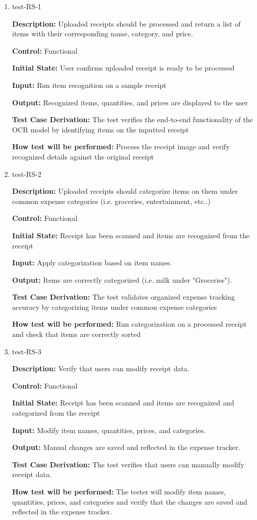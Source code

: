 \documentclass[12pt, titlepage]{article}
\begin{document}
\begin{enumerate}
\item{test-RS-1\\}

\textbf{Description:} Uploaded receipts should be processed and return a list of
items with their corresponding name, category, and price.

\textbf{Control:} Functional

\textbf{Initial State:} User confirms uploaded receipt is ready to be processed

\textbf{Input:} Run item recognition on a sample receipt

\textbf{Output:} Recognized items, quantities, and prices are displayed to the
user

\textbf{Test Case Derivation:} The test verifies the end-to-end functionality  of the OCR model
by identifying items on the inputted receipt

\textbf{How test will be performed:} Process the receipt image and verify
recognized details against the original receipt

\item{test-RS-2\\}

\textbf{Description:} Uploaded receipts should categorize items on them under common expense categories (i.e. groceries, entertainment, etc..)

\textbf{Control:} Functional

\textbf{Initial State:} Receipt has been scanned and items are recognized from the receipt

\textbf{Input:} Apply categorization based on item names.

\textbf{Output:} Items are correctly categorized (i.e. milk under "Groceries").

\textbf{Test Case Derivation:} The test validates organized expense tracking accuracy by categorizing items under common expense categories

\textbf{How test will be performed:} Run categorization on a processed receipt and check that items are correctly sorted


\item{test-RS-3\\}

\textbf{Description:} Verify that users can modify receipt data.

\textbf{Control:} Functional

\textbf{Initial State:} Receipt has been scanned and items are recognized and
categorized from the receipt

\textbf{Input:} Modify item names, quantities, prices, and categories.

\textbf{Output:} Manual changes are saved and reflected in the expense tracker.

\textbf{Test Case Derivation:} The test verifies that users can manually modify
receipt data.

\textbf{How test will be performed:} The tester will modify item names,
quantities, prices, and categories and verify that the changes are saved and
reflected in the expense tracker.


\end{enumerate}
\end{document}
